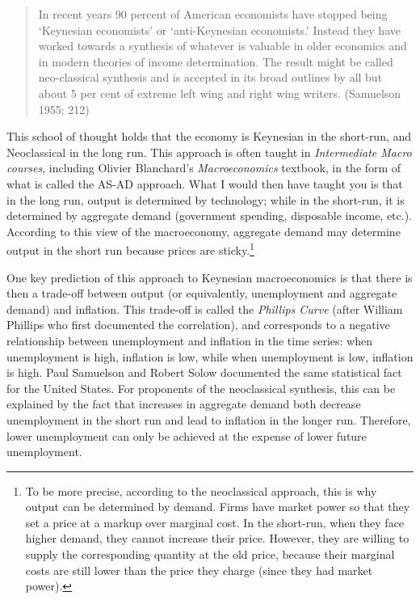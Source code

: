\documentclass[]{book}
\let\rmarkdownfootnote\footnote%
\def\footnote{\protect\rmarkdownfootnote}
\begin{document}
\begin{quote}
In recent years 90 percent of American economists have stopped being
`Keynesian economists' or `anti-Keynesian economists.' Instead they have
worked towards a synthesis of whatever is valuable in older economics
and in modern theories of income determination. The result might be
called neo-classical synthesis and is accepted in its broad outlines by
all but about 5 per cent of extreme left wing and right wing writers.
(Samuelson 1955: 212)
\end{quote}

This school of thought holds that the economy is Keynesian in the
short-run, and Neoclassical in the long run. This approach is often
taught in \emph{Intermediate Macro courses}, including Olivier
Blanchard's \emph{Macroeconomics} textbook, in the form of what is
called the AS-AD approach. What I would then have taught you is that in
the long run, output is determined by technology; while in the
short-run, it is determined by aggregate demand (government spending,
disposable income, etc.). According to this view of the macroeconomy,
aggregate demand may determine output in the short run because prices
are sticky.\footnote{To be more precise, according to the neoclassical
  approach, this is why output can be determined by demand. Firms have
  market power so that they set a price at a markup over marginal cost.
  In the short-run, when they face higher demand, they cannot increase
  their price. However, they are willing to supply the corresponding
  quantity at the old price, because their marginal costs are still
  lower than the price they charge (since they had market power).}

One key prediction of this approach to Keynesian macroeconomics is that
there is then a trade-off between output (or equivalently, unemployment
and aggregate demand) and inflation. This trade-off is called the
\emph{Phillips Curve} (after William Phillips who first documented the
correlation), and corresponds to a negative relationship between
unemployment and inflation in the time series: when unemployment is
high, inflation is low, while when unemployment is low, inflation is
high. Paul Samuelson and Robert Solow documented the same statistical
fact for the United States. For proponents of the neoclassical
synthesis, this can be explained by the fact that increases in aggregate
demand both decrease unemployment in the short run and lead to inflation
in the longer run. Therefore, lower unemployment can only be achieved at
the expense of lower future unemployment.
\end{document}
